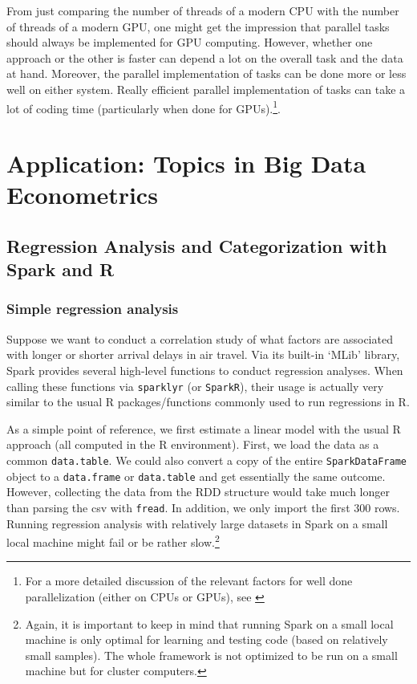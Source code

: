 \documentclass[
  12pt,
]{style/krantz}
\begin{document}
From just comparing the number of threads of a modern CPU with the number of threads of a modern GPU, one might get the impression that parallel tasks should always be implemented for GPU computing. However, whether one approach or the other is faster can depend a lot on the overall task and the data at hand. Moreover, the parallel implementation of tasks can be done more or less well on either system. Really efficient parallel implementation of tasks can take a lot of coding time (particularly when done for GPUs).\footnote{For a more detailed discussion of the relevant factors for well done parallelization (either on CPUs or GPUs), see \citet{matloff_2015}}.

\hypertarget{part-application-topics-in-big-data-econometrics}{%
\part{Application: Topics in Big Data Econometrics}\label{part-application-topics-in-big-data-econometrics}}

\hypertarget{regression-analysis-and-categorization-with-spark-and-r}{%
\chapter{Regression Analysis and Categorization with Spark and R}\label{regression-analysis-and-categorization-with-spark-and-r}}

\hypertarget{simple-regression-analysis}{%
\section{Simple regression analysis}\label{simple-regression-analysis}}

Suppose we want to conduct a correlation study of what factors are associated with longer or shorter arrival delays in air travel. Via its built-in `MLib' library, Spark provides several high-level functions to conduct regression analyses. When calling these functions via \texttt{sparklyr} (or \texttt{SparkR}), their usage is actually very similar to the usual R packages/functions commonly used to run regressions in R.

As a simple point of reference, we first estimate a linear model with the usual R approach (all computed in the R environment). First, we load the data as a common \texttt{data.table}. We could also convert a copy of the entire \texttt{SparkDataFrame} object to a \texttt{data.frame} or \texttt{data.table} and get essentially the same outcome. However, collecting the data from the RDD structure would take much longer than parsing the csv with \texttt{fread}. In addition, we only import the first 300 rows. Running regression analysis with relatively large datasets in Spark on a small local machine might fail or be rather slow.\footnote{Again, it is important to keep in mind that running Spark on a small local machine is only optimal for learning and testing code (based on relatively small samples). The whole framework is not optimized to be run on a small machine but for cluster computers.}
\end{document}
